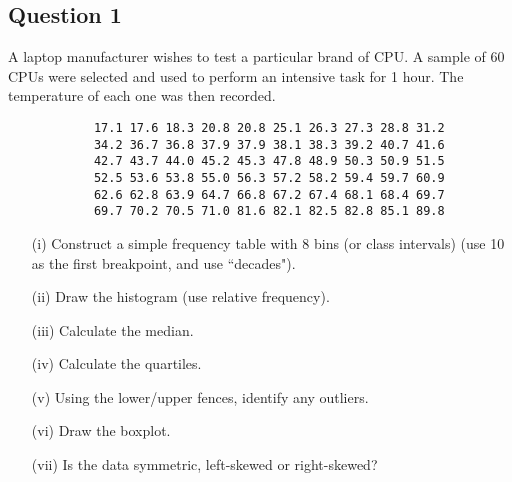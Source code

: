 \subsection*{Question 1}
A laptop manufacturer wishes to test a particular brand of CPU. A sample of 60 CPUs were selected and used to perform an intensive task for 1 hour. The temperature of each one was then recorded.
\begin{center}
	{
		\begin{framed}
			\large
			\begin{verbatim}
			17.1 17.6 18.3 20.8 20.8 25.1 26.3 27.3 28.8 31.2
			34.2 36.7 36.8 37.9 37.9 38.1 38.3 39.2 40.7 41.6
			42.7 43.7 44.0 45.2 45.3 47.8 48.9 50.3 50.9 51.5
			52.5 53.6 53.8 55.0 56.3 57.2 58.2 59.4 59.7 60.9
			62.6 62.8 63.9 64.7 66.8 67.2 67.4 68.1 68.4 69.7
			69.7 70.2 70.5 71.0 81.6 82.1 82.5 82.8 85.1 89.8
			\end{verbatim}
		\end{framed}
	}
\end{center}

\begin{itemize}
	\item[(i)] Construct a simple frequency table with 8 bins (or class intervals) (use 10 as the first breakpoint, and use ``decades"). 
	\item[(ii)] Draw the histogram (use relative frequency). 
	\item[(iii)] Calculate the median. 
	\item[(iv)] Calculate the quartiles. 
	\item[(v)] Using the lower/upper fences, identify any outliers. 
	\item[(vi)] Draw the boxplot. 
	\item[(vii)] Is the data symmetric, left-skewed or right-skewed?
\end{itemize}


